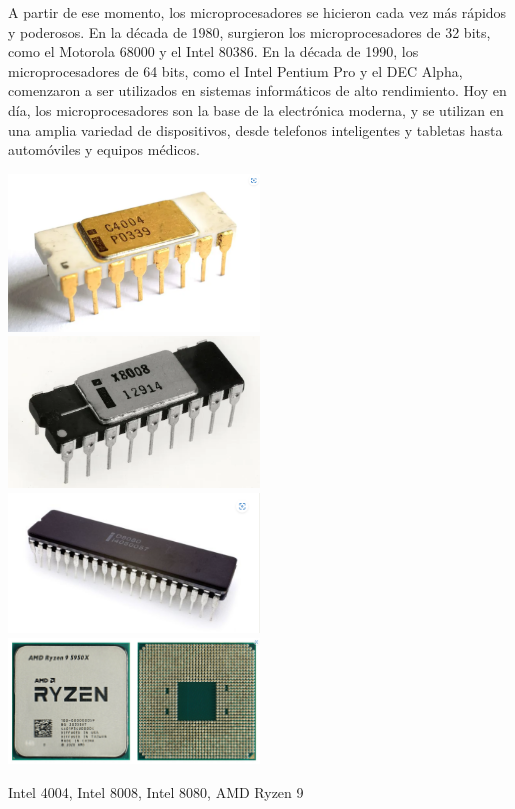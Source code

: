 \documentclass{article}
\begin{document}
A partir de ese momento, los microprocesadores se hicieron cada vez más rápidos y poderosos. En la década de 1980, surgieron los microprocesadores de 32 bits,
como el Motorola 68000 y el Intel 80386. En la década de 1990, los microprocesadores de 64 bits, como el Intel Pentium Pro y el DEC Alpha, 
comenzaron a ser utilizados en sistemas informáticos de alto rendimiento. Hoy en día, los microprocesadores son la base de la electrónica moderna, 
y se utilizan en una amplia variedad de dispositivos, desde telefonos inteligentes y tabletas hasta automóviles y equipos médicos.

\includegraphics[width=0.5\textwidth]{res/intel_4004.png}
\includegraphics[width=0.5\textwidth]{res/intel_8008.png}
\includegraphics[width=0.5\textwidth]{res/intel_8080.png}
\includegraphics[width=0.5\textwidth]{res/amd_ryzen9.png}\\
\begin{center}
    Intel 4004, Intel 8008, Intel 8080, AMD Ryzen 9
\end{center}
\end{document}
